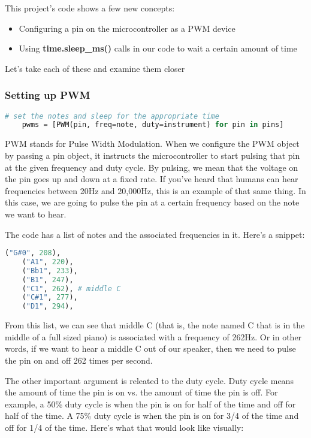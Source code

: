 This project's code shows a few new concepts:
\begin{itemize}
    \item Configuring a pin on the microcontroller as a PWM device
    \item Using \textbf{time.sleep_ms()} calls in our code to wait a certain amount of time
\end{itemize}

Let's take each of these and examine them closer

\subsubsection{Setting up PWM}
\begin{lstlisting}[language=Python,caption=PWM Mode]
    # set the notes and sleep for the appropriate time
    pwms = [PWM(pin, freq=note, duty=instrument) for pin in pins]
\end{lstlisting}

PWM stands for Pulse Width Modulation. When we configure the PWM object by passing
a pin object, it instructs the microcontroller to start pulsing that pin at the given
frequency and duty cycle. By pulsing, we mean that the voltage on the pin goes up and
down at a fixed rate. If you've heard that humans can hear frequencies between 20Hz and 20,000Hz,
this is an example of that same thing. In this case, we are going to pulse the pin at
a certain frequency based on the note we want to hear.

The code has a list of notes and the associated frequencies in it. Here's a snippet:

\begin{lstlisting}[language=Python,caption=Note names mapped to frequencies]
    ("G#0", 208),
    ("A1", 220),
    ("Bb1", 233),
    ("B1", 247),
    ("C1", 262), # middle C
    ("C#1", 277),
    ("D1", 294),
\end{lstlisting}

From this list, we can see that middle C (that is, the note named C that is in the middle
of a full sized piano) is associated with a frequency of 262Hz. Or in other words, if we
want to hear a middle C out of our speaker, then we need to pulse the pin on and off 262
times per second.

The other important argument is releated to the duty cycle. Duty cycle means the amount
of time the pin is on vs. the amount of time the pin is off. For example, a 50\% duty cycle
is when the pin is on for half of the time and off for half of the time. A 75\% duty cycle
is when the pin is on for 3/4 of the time and off for 1/4 of the time. Here's what that
would look like visually:

